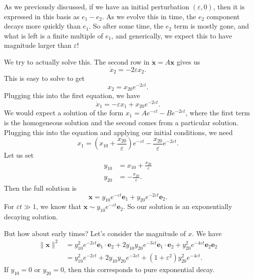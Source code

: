 \documentclass[a4paper]{article}
\begin{document}
As we previously discussed, if we have an initial perturbation $(\varepsilon, 0)$, then it is expressed in this basis as $e_1 - e_2$. As we evolve this in time, the $e_2$ component decays more quickly than $e_1$. So after some time, the $e_2$ term is mostly gone, and what is left is a finite multiple of $e_1$, and generically, we expect this to have magnitude larger than $\varepsilon$!

We try to actually solve this. The second row in $\dot{\mathbf{x}} = A\mathbf{x}$ gives us
\[
  \dot{x}_2 = -2\varepsilon x_2.
\]
This is easy to solve to get
\[
  x_2 = x_{20} e^{-2\varepsilon t}.
\]
Plugging this into the first equation, we have
\[
  \dot{x}_1 = -\varepsilon x_1 + x_{20} e^{-2\varepsilon t}.
\]
We would expect a solution of the form $x_1 = A e^{-\varepsilon t} - B e^{-2 \varepsilon t}$, where the first term is the homogeneous solution and the second comes from a particular solution. Plugging this into the equation and applying our initial conditions, we need
\[
  x_1 = \left(x_{10} + \frac{x_{20}}{\varepsilon}\right) e^{-\varepsilon t} - \frac{x_{20}}{\varepsilon} e^{-2 \varepsilon t}.
\]
Let us set
\begin{align*}
  y_{10} &= x_{10} + \frac{x_{20}}{\varepsilon}\\
  y_{20} &= -\frac{x_{20}}{\varepsilon}.
\end{align*}
Then the full solution is
\[
  \mathbf{x} = y_{10} e^{-\varepsilon t} \mathbf{e}_1 + y_{20} e^{-2\varepsilon t} \mathbf{e}_2.
\]
For $\varepsilon t \gg 1$, we know that $\mathbf{x} \sim y_{10} e^{-\varepsilon t} \mathbf{e}_2$. So our solution is an exponentially decaying solution.

But how about early times? Let's consider the magnitude of $x$. We have
\begin{align*}
  \|\mathbf{x}\|^2 &= y_{10}^2 e^{-2 \varepsilon t} \mathbf{e}_1 \cdot \mathbf{e}_2 + 2y_{10} y_{20} e^{-3\varepsilon t} \mathbf{e}_1 \cdot \mathbf{e}_2 + y_{20}^2 e^{-4\varepsilon t} \mathbf{e}_2 \mathbf{e}_2\\
  &= y_{10}^2 e^{-2\varepsilon t} + 2y_{10} y_{20} e^{-3 \varepsilon t} + (1 + \varepsilon^2) y_{20}^2 e^{-4 \varepsilon t}.
\end{align*}
If $y_{10} = 0$ or $y_{20} = 0$, then this corresponds to pure exponential decay.
\end{document}
